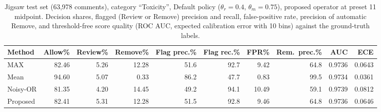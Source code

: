 \begin{table}[!t]
\caption{Jigsaw test set (63,978 comments), category ``Toxicity'', Default policy ($\theta_r=0.4$, $\theta_m=0.75$),
proposed operator at preset 11 midpoint. Decision shares, flagged (Review or Remove) precision and recall,
false-positive rate, precision of automatic Remove, and threshold-free score quality (ROC AUC, expected calibration
error with 10 bins) against the ground-truth labels.}
\label{tab:jigsaw-methods}
\centering\scriptsize
\begin{tabular}{@{}lrrrrrrrrr@{}}
\toprule
\textbf{Method} & \textbf{Allow\%} & \textbf{Review\%} & \textbf{Remove\%} & \textbf{Flag prec.\%} &
\textbf{Flag rec.\%} & \textbf{FPR\%} & \textbf{Rem.\ prec.\%} & \textbf{AUC} & \textbf{ECE} \\
\midrule
MAX & 82.46 & 5.26 & 12.28 & 51.6 & 92.7 & 9.42 & 64.8 & 0.9736 & 0.0643 \\
Mean & 94.60 & 5.07 & 0.33 & 86.2 & 47.7 & 0.83 & 99.5 & 0.9734 & 0.0361 \\
Noisy-OR & 81.35 & 4.20 & 14.45 & 49.2 & 94.1 & 10.49 & 59.1 & 0.9739 & 0.0812 \\
Proposed & 82.41 & 5.31 & 12.28 & 51.5 & 92.8 & 9.46 & 64.8 & 0.9736 & 0.0646 \\
\bottomrule
\end{tabular}
\end{table}
